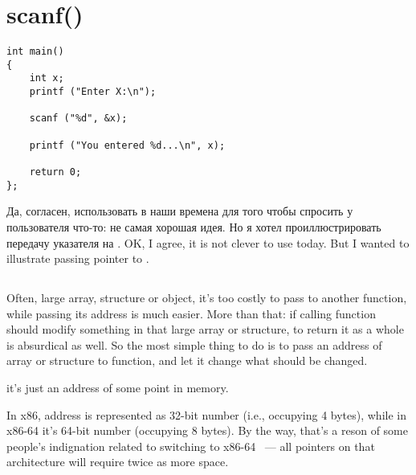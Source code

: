 ﻿\section{scanf()}
\label{label_scanf}


\begin{lstlisting}
int main() 
{
	int x;
	printf ("Enter X:\n");

	scanf ("%d", &x);

	printf ("You entered %d...\n", x);

	return 0;
};
\end{lstlisting}

\IFRU
{Да, согласен, использовать \scanf в наши времена для того чтобы спросить у пользователя что-то: 
не самая хорошая идея.
Но я хотел проиллюстрировать передачу указателя на \Tint.}
{OK, I agree, it is not clever to use \scanf today. But I wanted to illustrate passing pointer to \Tint.}

\subsection{}
\index{\CLanguageElements!\Pointers}

{Often, large array, structure or object, it's too costly to pass to another function, 
while passing its address is much easier.}
{More than that: if calling function should modify something in that large array or structure,
to return it as a whole is absurdical as well.}
{So the most simple thing to do is to pass an address of array or structure to function,
and let it change what should be changed.}

 \CCpp {}
{it's just an address of some point in memory.}

{In x86, address is represented as 32-bit number (i.e., occupying 4 bytes), while in x86-64 it's 64-bit number
(occupying 8 bytes).}
{By the way, that's a reson of some people's indignation related to switching to x86-64 ~--- all pointers
on that architecture will require twice as more space.}


